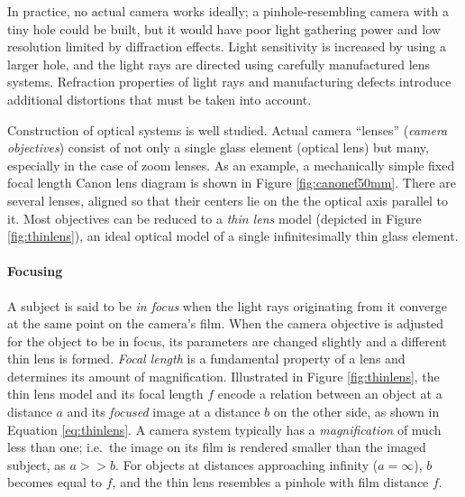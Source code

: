 In practice, no actual camera works ideally; a pinhole-resembling camera with a tiny hole could be built, but it would have poor light gathering power and low resolution limited by diffraction effects. \cite{greenleaf1950photographic}
Light sensitivity is increased by using a larger hole, and the light rays are directed using carefully manufactured lens systems.
Refraction properties of light rays and manufacturing defects introduce additional distortions that must be taken into account.

Construction of optical systems is well studied. \cite{kingslake1989history,greenleaf1950photographic}
Actual camera ``lenses'' (\emph{camera objectives}) consist of not only a single glass element (optical lens) but many, especially in the case of zoom lenses.
As an example, a mechanically simple fixed focal length Canon lens diagram is shown in Figure \ref{fig:canonef50mm}.
There are several lenses, aligned so that their centers lie on the the optical axis parallel to it.
Most objectives can be reduced to a \emph{thin lens} model (depicted in Figure \ref{fig:thinlens}), an ideal optical model of a single infinitesimally thin glass element.
 \cite{greenleaf1950photographic,szeliski10vision}




\paragraph{Focusing}
A subject is said to be \emph{in focus} when the light rays originating from it converge at the same point on the camera's film.
When the camera objective is adjusted for the object to be in focus, its parameters are changed slightly and a different thin lens is formed.
\emph{Focal length} is a fundamental property of a lens and determines its amount of magnification.
\cite{szeliski10vision,greenleaf1950photographic}
Illustrated in Figure \ref{fig:thinlens}, the thin lens model and its focal length $f$ encode a relation between an object at a distance $a$ and its \emph{focused} image at a distance $b$ on the other side, as shown in Equation \ref{eq:thinlens}.
A camera system typically has a \emph{magnification} of much less than one; i.e.\ the image on its film is rendered smaller than the imaged subject, as $a >> b$.
For objects at distances approaching infinity ($a = \infty$), $b$ becomes equal to $f$, and the thin lens resembles a pinhole with film distance $f$.


